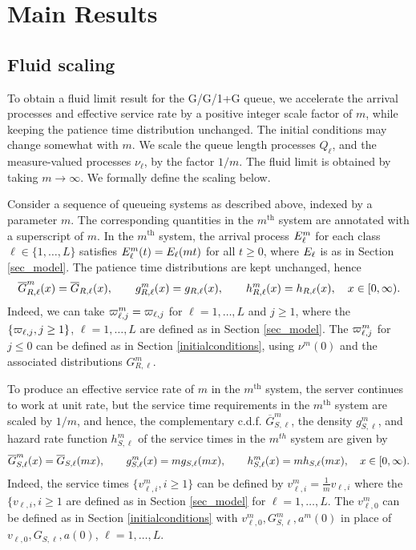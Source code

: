 \documentclass{article}
\numberwithin{equation}{section}
\begin{document}




\section{Main Results}

\subsection{Fluid scaling}\label{sec_seq}

To obtain a fluid limit result for the G/G/1+G queue, we  accelerate the arrival processes and effective service rate by a positive integer scale factor of $m$, while keeping the patience time distribution unchanged. The initial conditions may change somewhat with $m$.  We  scale the queue length processes $Q_\ell$, and the measure-valued processes $\nu_\ell$, by the factor $1/m$. 
The fluid limit is obtained by taking $m\to\infty$. We formally define the scaling below. 

Consider a sequence of queueing systems as described above, indexed by a parameter $m$. The corresponding quantities in the $m^\text{th}$ system are annotated with a superscript of $m$. In the $m^\text{th}$ system,  the arrival process $E^m_\ell$ for each class $\ell\in \{ 1, \ldots, L\}$ satisfies $E^m_\ell(t)=E_\ell(mt) $ for all $t\geq 0$, where $E_\ell$ is as in Section
\ref{sec_model}.
 The patience time distributions are kept unchanged, hence
\[
    \overline G^m_{R,\ell}(x)=\overline G_{R,\ell}(x),\quad\quad g^m_{R,\ell}(x)=g_{R,\ell}(x),\quad\quad h^m_{R,\ell}(x)=h_{R,\ell}(x),\quad x\in[0,\infty).
\]
Indeed, we can take $ \varpi^m_{\ell, j}= \varpi_{\ell, j}$ for $\ell =1, \ldots, L$ and $j\geq 1$, where the $\{\varpi_{\ell, j}, j\geq 1 \}$, $\ell =1, \ldots, L$ are defined as in 
Section \ref{sec_model}. The $\varpi^m_{\ell, j} $ for $j\leq 0$ can be defined as in Section \ref{initialconditions}, using $\nu^m(0)$ and the associated distributions $G^m_{R, \ell}$. 

To produce an effective service rate of $m$ in the $m^{\text{th}}$ system, the server continues to work at unit rate, but 
the service time requirements in the $m^\text{th}$ system are scaled by $1/m$, and hence, the complementary c.d.f. $\overline G^m_{S,\ell}$, the density $g^m_{S,\ell}$, and hazard rate function $h^m_{S,\ell}$ of the service times in the $m^{th}$ system are given by
\[
    \overline G^m_{S,\ell}(x)=\overline G_{S,\ell}(mx),\quad\quad g^m_{S,\ell}(x)=m g_{S,\ell}(mx),\quad\quad h^m_{S,\ell}(x)=mh_{S,\ell}(mx),\quad x\in[0,\infty).
\]
Indeed, the service times $\{  v^m_{\ell, i} , i\geq 1\}$ can be defined by 
 $v^m_{\ell, i} =\frac{1}{m} v_{\ell, i}$ where the $\{v_{\ell, i}, i\geq 1$ are defined as in Section \ref{sec_model} for $\ell =1, \ldots, L$.
 The $ v^m_{\ell, 0} $ can be defined as in Section \ref{initialconditions} with $ v^m_{\ell, 0}, G^m_{S,\ell}, a^m(0)$  in place of $ v_{\ell, 0}, G_{S,\ell},a(0)$, $\ell =1, \ldots, L$.
\end{document}
